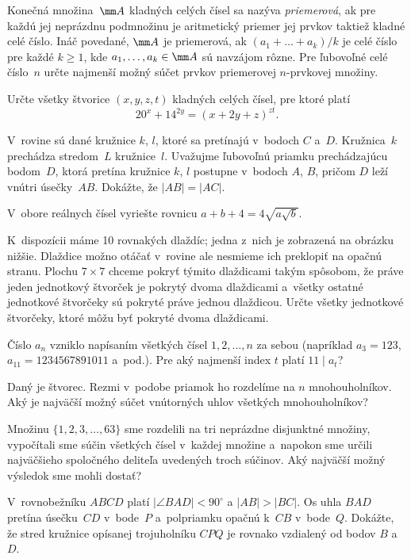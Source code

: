 {%
Konečná množina~$\mm A$ kladných celých čísel sa nazýva {\it priemerová}, ak pre každú jej neprázdnu podmnožinu je aritmetický priemer jej prvkov taktiež kladné celé číslo. Ináč povedané, $\mm A$ je priemerová, ak $(a_1+\dots+a_k)/k$ je celé číslo pre každé $k\ge 1$, kde $a_1,\dots,a_k\in \mm A$ sú navzájom rôzne. Pre ľubovoľné celé číslo~$n$ určte najmenší možný súčet prvkov priemerovej $n$-prvkovej množiny.}

{%
Určte všetky štvorice $(x,y,z,t)$ kladných celých čísel, pre ktoré platí
$$
	20^x+14^{2y}=(x+2y+z)^{zt}.
$$}

{%
V~rovine sú dané kružnice $k$, $l$, ktoré sa pretínajú v~bodoch $C$ a~$D$. Kružnica~$k$ prechádza stredom~$L$ kružnice~$l$. Uvažujme ľubovoľnú priamku prechádzajúcu bodom~$D$, ktorá pretína kružnice $k$, $l$ postupne v~bodoch $A$, $B$, pričom $D$ leží vnútri úsečky~$AB$. Dokážte, že $|AB|=|AC|$.
}

{%
V~obore reálnych čísel vyriešte rovnicu $a+b+4=4\sqrt{a\sqrt{b}}$.
}

{%
K~dispozícii máme 10 rovnakých dlaždíc; jedna z~nich je zobrazená na obrázku nižšie. Dlaždice možno otáčať v~rovine ale nesmieme ich preklopiť na opačnú stranu. Plochu $7\times 7$ chceme pokryť týmito dlaždicami takým spôsobom, že práve jeden jednotkový štvorček je pokrytý dvoma dlaždicami a~všetky ostatné jednotkové štvorčeky sú pokryté práve jednou dlaždicou. Určte všetky jednotkové štvorčeky, ktoré môžu byť pokryté dvoma dlaždicami.
}

{%
Číslo $a_n$ vzniklo napísaním všetkých čísel $1,2,...,n$ za sebou (napríklad $a_3=123$, $a_{11}=1234567891011$ a~pod.). Pre aký najmenší index $t$ platí $11 \mid a_t$?
}

{%
Daný je štvorec. Rezmi v~podobe priamok ho rozdelíme na $n$ mnohouholníkov.
Aký je najväčší možný súčet vnútorných uhlov všetkých mnohouholníkov?
}

{%
Množinu $\{1,2,3,\dots,63\}$ sme rozdelili na tri neprázdne disjunktné množiny, vypočítali sme súčin všetkých čísel v~každej množine a~napokon sme určili najväčšieho spoločného deliteľa uvedených troch súčinov. Aký najväčší možný výsledok sme mohli dostať?
}

{%
V~rovnobežníku $ABCD$ platí $|\angle BAD|<90^\circ$ a $|AB|>|BC|$. Os uhla $BAD$ pretína úsečku~$CD$ v~bode~$P$ a~polpriamku opačnú k~$CB$ v~bode~$Q$. Dokážte, že stred kružnice opísanej trojuholníku $CPQ$ je rovnako vzdialený od bodov $B$ a~$D$.
}

